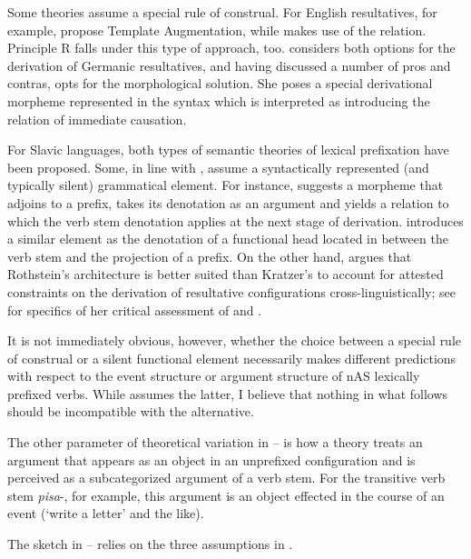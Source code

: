 \documentclass[output=paper,colorlinks,citecolor=brown]{langscibook}
\begin{document}
Some theories assume a special rule of construal. For English resultatives, for example, \citet{Rappaport.Hovav.Levin2001} propose Template Augmentation, while \citet{Rothstein2004} makes use of the  relation.  Principle R falls under this type of approach, too. \citet{Kratzer2005} considers both options for the derivation of Germanic resultatives, and having discussed a number of pros and contras, opts for the morphological solution. She poses a special derivational morpheme represented in the syntax which is interpreted as introducing the relation of immediate causation. 

For Slavic languages, both types of semantic theories of lexical prefixation have been proposed. Some, in line with \citet{Kratzer2005}, assume a syntactically represented (and typically silent) grammatical element. For instance, \citet[53]{BabkoMalaya1999} suggests a morpheme that adjoins to a prefix, takes its denotation as an argument and yields a relation to which the verb stem denotation applies at the next stage of derivation. \citet[ch. 3]{Biskup2019} introduces a similar element as the denotation of a functional head located in between the verb stem and the projection of a prefix. On the other hand, \citet{Gehrke2008} argues that Rothstein’s architecture is better suited than Kratzer’s to account for attested constraints on the derivation of resultative configurations cross-linguistically; see \citet[61--63]{Gehrke2008} for specifics of her critical assessment of \citet{Kratzer2005} and \citet{Rothstein2004}.  

It is not immediately obvious, however, whether the choice between a special rule of construal or a silent functional element necessarily makes different predictions with respect to the event structure or argument structure of nAS lexically prefixed verbs. While  assumes the latter, I believe that nothing in what follows should be incompatible with the alternative.

The other parameter of theoretical variation in -- is how a theory treats an argument that appears as an object in an unprefixed configuration and is perceived as a subcategorized argument of a verb stem. For the transitive verb stem \textit{pisa}-, for example, this argument is an object effected in the course of an event (‘write a letter’ and the like).

The sketch in -- relies on the three assumptions in .
\end{document}

